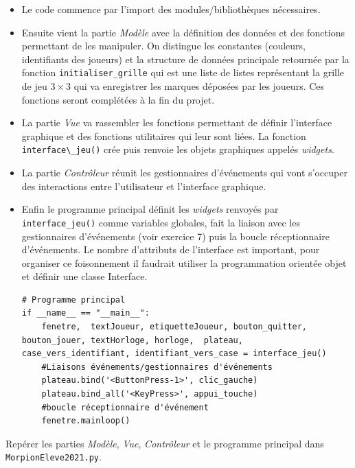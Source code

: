 \documentclass[a4paper, french, 12pt]{article}  %
\newcounter{exo}
\newcounter{exoB}
\newenvironment{exerciceB2}
{\par \bigskip  \noindent \addtocounter{exoB}{1} \hrulefill \quad { \large \textbf{Exercice \theexoB}} \quad \hrulefill \par \medskip }
{\par \bigskip }
\newcounter{act}
\newcounter{rque}
\begin{document}
\begin{itemize}
	\item Le code commence par l'import des modules/bibliothèques nécessaires.
	\item Ensuite vient la partie \textit{Modèle} avec la définition des données et des fonctions permettant de les  manipuler.  On distingue les constantes (couleurs, identifiants des joueurs) et la structure de données principale retournée par la fonction \texttt{initialiser\_grille}  qui est une liste de listes représentant la grille de jeu $3 \times 3$  qui va  enregistrer   les marques déposées par les joueurs. Ces fonctions seront complétées à la fin du projet.

\item La partie \textit{Vue} va rassembler les fonctions permettant de  définir l'interface graphique et des fonctions utilitaires qui leur sont liées. La fonction \verb+interface\_jeu()+ crée puis renvoie les objets graphiques appelés \textit{widgets}.

\item La partie \textit{Contrôleur} réunit les gestionnaires d'événements qui vont s'occuper des interactions entre l'utilisateur et l'interface graphique.
	
\item Enfin le programme principal définit les \textit{widgets} renvoyés par \verb+interface_jeu()+ comme variables globales, fait la liaison avec les gestionnaires d'événements (voir exercice  7) puis la boucle réceptionnaire d'événements. Le nombre d'attributs de l'interface est important, pour organiser ce foisonnement il faudrait utiliser la programmation orientée objet et définir une classe Interface.


\begin{lstlisting}[style=rond]
# Programme principal
if __name__ == "__main__":
    fenetre,  textJoueur, etiquetteJoueur, bouton_quitter, bouton_jouer, textHorloge, horloge,  plateau, case_vers_identifiant, identifiant_vers_case = interface_jeu()
    #Liaisons événements/gestionnaires d'événements
    plateau.bind('<ButtonPress-1>', clic_gauche)
    plateau.bind_all('<KeyPress>', appui_touche)
    #boucle réceptionnaire d'événement 
    fenetre.mainloop()
\end{lstlisting}  

\end{itemize} 
 
 
\begin{exerciceB2}{}

Repérer les parties \textit{Modèle}, \textit{Vue},  \textit{Contrôleur} et le programme principal  dans  \texttt{MorpionEleve2021.py}.

\end{exerciceB2}
\end{document}

